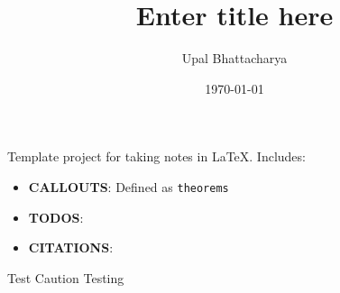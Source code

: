 \documentclass[a4paper,colorinlistoftodos]{article}
\author{Upal Bhattacharya}
\date{\today}
\title{Enter title here}
\begin{document}
\maketitle

\begingroup
    \hypersetup{linkcolor=black}
    \tableofcontents
    \listoftodos
    \pagebreak
\endgroup

\linenumbers

Template project for taking notes in \LaTeX.
Includes:
\begin{itemize}
\item \textbf{CALLOUTS}: Defined as \verb|theorems|
\item \textbf{TODOS}:
\item \textbf{CITATIONS}: \cite{openai2024HelloGpt4o}
\end{itemize}

\begin{caution}{Test Caution}{}
Testing
\end{caution}




\end{document}
